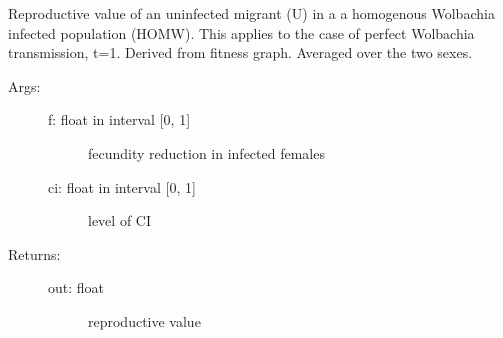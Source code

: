 \documentclass[letterpaper,10pt,english]{sphinxmanual}
\begin{document}
\begin{fulllineitems}
\label{index:wspec.analytical.reproval_UHOMW}
Reproductive value of an uninfected migrant (U) in a a 
homogenous Wolbachia infected population (HOMW). This applies to 
the case of perfect Wolbachia transmission, t=1. Derived from 
fitness graph. Averaged over the two sexes.
\begin{description}
\item[{Args:}] \leavevmode\begin{description}
\item[{f: float in interval {[}0, 1{]}}] \leavevmode
fecundity reduction in infected females

\item[{ci: float in interval {[}0, 1{]}}] \leavevmode
level of CI

\end{description}

\item[{Returns:}] \leavevmode\begin{description}
\item[{out: float}] \leavevmode
reproductive value

\end{description}

\end{description}

\end{fulllineitems}

\end{document}
